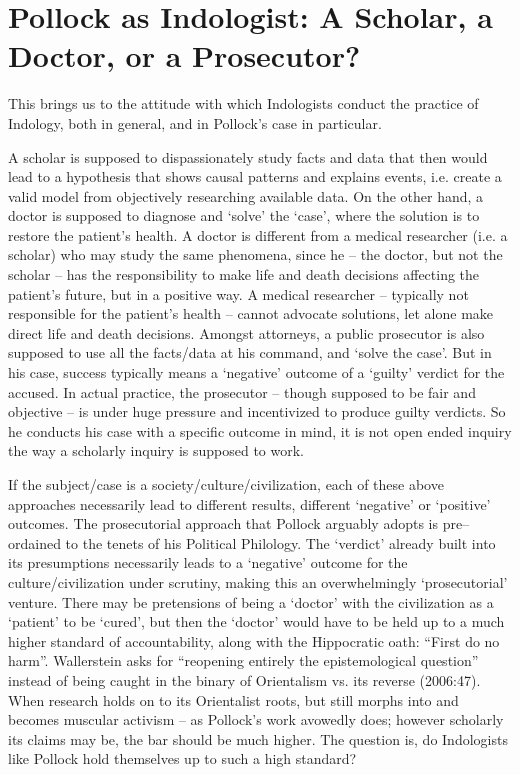 \section*{Pollock as Indologist: A Scholar, a Doctor, or a Prosecutor?}

This brings us to the attitude with which Indologists conduct the practice of Indology, both in general, and in Pollock’s case in particular.

A scholar is supposed to dispassionately study facts and data that then would lead to a hypothesis that shows causal patterns and explains events, i.e. create a valid model from objectively researching available data. On the other hand, a doctor is supposed to diagnose and ‘solve’ the ‘case’, where the solution is to restore the patient’s health. A doctor is different from a medical researcher (i.e. a scholar) who may study the same phenomena, since he – the doctor, but not the scholar – has the responsibility to make life and death decisions affecting the patient’s future, but in a positive way. A medical researcher – typically not responsible for the patient’s health – cannot advocate solutions, let alone make direct life and death decisions. Amongst attorneys, a public prosecutor is also supposed to use all the facts/data at his command, and ‘solve the case’. But in his case, success typically means a ‘negative’ outcome of a ‘guilty’ verdict for the accused. In actual practice, the prosecutor – though supposed to be fair and objective – is under huge pressure and incentivized to produce guilty verdicts. So he conducts his case with a specific outcome in mind, it is not open ended inquiry the way a scholarly inquiry is supposed to work.

If the subject/case is a society/culture/civilization, each of these above approaches necessarily lead to different results, different ‘negative’ or ‘positive’ outcomes. The prosecutorial approach that Pollock arguably adopts is pre–ordained to the tenets of his Political Philology. The ‘verdict’ already built into its presumptions necessarily leads to a ‘negative’ outcome for the culture/civilization under scrutiny, making this an overwhelmingly ‘prosecutorial’ venture. There may be pretensions of being a ‘doctor’ with the civilization as a ‘patient’ to be ‘cured’, but then the ‘doctor’ would have to be held up to a much higher standard of accountability, along with the Hippocratic oath: “First do no harm”. Wallerstein asks for “reopening entirely the epistemological question” instead of being caught in the binary of Orientalism vs. its reverse (2006:47). When research holds on to its Orientalist roots, but still morphs into and becomes muscular activism – as Pollock’s work avowedly does; however scholarly its claims may be, the bar should be much higher. The question is, do Indologists like Pollock hold themselves up to such a high standard?

